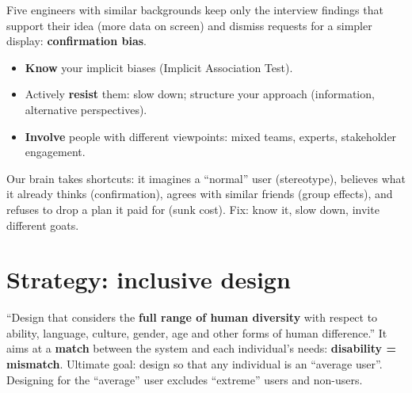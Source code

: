 \documentclass[11pt,a4paper,openany]{book}
\begin{document}
\begin{exbox}[title={Exam-type question}]
Five engineers with similar backgrounds keep only the interview findings that support their idea
(more data on screen) and dismiss requests for a simpler display: \textbf{confirmation bias}.
\end{exbox}

\begin{algbox}[title={Improving design practice}]
\begin{itemize}
  \item \textbf{Know} your implicit biases (Implicit Association Test).
  \item Actively \textbf{resist} them: slow down; structure your approach (information,
        alternative perspectives).
  \item \textbf{Involve} people with different viewpoints: mixed teams, experts, stakeholder
        engagement.
\end{itemize}
\end{algbox}

\begin{goatbox}
Our brain takes shortcuts: it imagines a ``normal'' user (stereotype), believes what it already
thinks (confirmation), agrees with similar friends (group effects), and refuses to drop a plan it
paid for (sunk cost). Fix: know it, slow down, invite different goats.
\end{goatbox}


\section{Strategy: inclusive design}

\begin{defnbox}[title={Inclusive design (Inclusive Design Research Centre)}]
``Design that considers the \textbf{full range of human diversity} with respect to ability,
language, culture, gender, age and other forms of human difference.'' It aims at a
\textbf{match} between the system and each individual's needs: \textbf{disability = mismatch}.
Ultimate goal: design so that any individual is an ``average user''. Designing for the
``average'' user excludes ``extreme'' users and non-users.
\end{defnbox}
\end{document}
